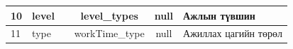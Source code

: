 \begin{table}[ht]
\begin{tabular}{|l|l|c|c|c|l|}
    10                               & level                                     &                                                                     & level\_types                                                        & null                                                            & Ажлын түвшин                                                                                      \\ \hline
    11                               & type                                      &                                                                     & workTime\_type                                                      & null                                                            & Ажиллах цагийн төрөл                                                                              \\ \hline
    \end{tabular}
\end{table}

